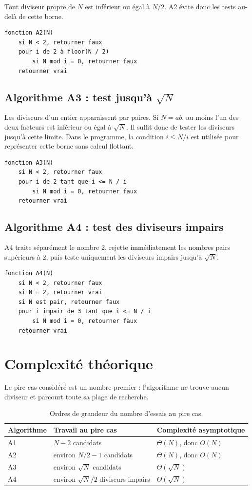 \documentclass[11pt,a4paper]{article}
\begin{document}
Tout diviseur propre de $N$ est inférieur ou égal à $N/2$. A2 évite donc les tests au-delà de cette borne.

\begin{verbatim}
fonction A2(N)
    si N < 2, retourner faux
    pour i de 2 à floor(N / 2)
        si N mod i = 0, retourner faux
    retourner vrai
\end{verbatim}

\subsection{Algorithme A3 : test jusqu'à $\sqrt{N}$}

Les diviseurs d'un entier apparaissent par paires. Si $N=ab$, au moins l'un des deux facteurs est inférieur ou égal à $\sqrt{N}$. Il suffit donc de tester les diviseurs jusqu'à cette limite. Dans le programme, la condition $i\leq N/i$ est utilisée pour représenter cette borne sans calcul flottant.

\begin{verbatim}
fonction A3(N)
    si N < 2, retourner faux
    pour i de 2 tant que i <= N / i
        si N mod i = 0, retourner faux
    retourner vrai
\end{verbatim}

\subsection{Algorithme A4 : test des diviseurs impairs}

A4 traite séparément le nombre 2, rejette immédiatement les nombres pairs supérieurs à 2, puis teste uniquement les diviseurs impairs jusqu'à $\sqrt{N}$.

\begin{verbatim}
fonction A4(N)
    si N < 2, retourner faux
    si N = 2, retourner vrai
    si N est pair, retourner faux
    pour i impair de 3 tant que i <= N / i
        si N mod i = 0, retourner faux
    retourner vrai
\end{verbatim}

\section{Complexité théorique}

Le pire cas considéré est un nombre premier : l'algorithme ne trouve aucun diviseur et parcourt toute sa plage de recherche.

\begin{table}[H]
\centering
\begin{tabular}{lll}
\toprule
Algorithme & Travail au pire cas & Complexité asymptotique \\
\midrule
A1 & $N-2$ candidats & $\Theta(N)$, donc $O(N)$ \\
A2 & environ $N/2-1$ candidats & $\Theta(N)$, donc $O(N)$ \\
A3 & environ $\sqrt{N}$ candidats & $\Theta(\sqrt{N})$ \\
A4 & environ $\sqrt{N}/2$ diviseurs impairs & $\Theta(\sqrt{N})$ \\
\bottomrule
\end{tabular}
\caption{Ordres de grandeur du nombre d'essais au pire cas.}
\end{table}
\end{document}
